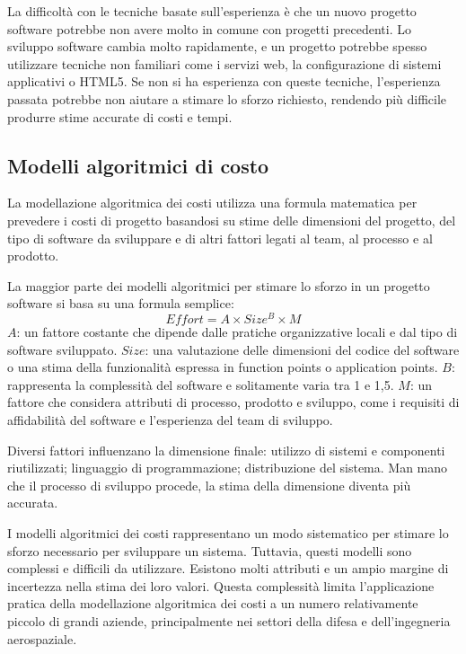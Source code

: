 La difficoltà con le tecniche basate sull'esperienza è che un nuovo progetto software potrebbe non avere molto in comune con progetti precedenti. Lo sviluppo software cambia molto rapidamente, e un progetto potrebbe spesso utilizzare tecniche non familiari come i servizi web, la configurazione di sistemi applicativi o HTML5. Se non si ha esperienza con queste tecniche, l'esperienza passata potrebbe non aiutare a stimare lo sforzo richiesto, rendendo più difficile produrre stime accurate di costi e tempi.

\subsection{Modelli algoritmici di costo}
La modellazione algoritmica dei costi utilizza una formula matematica per prevedere i costi di progetto basandosi su stime delle dimensioni del progetto, del tipo di software da sviluppare e di altri fattori legati al team, al processo e al prodotto.

La maggior parte dei modelli algoritmici per stimare lo sforzo in un progetto software si basa su una formula semplice:
\begin{equation*}
    Effort = A\times Size^B\times M
\end{equation*}
$A$: un fattore costante che dipende dalle pratiche organizzative locali e dal tipo di software sviluppato. $Size$: una valutazione delle dimensioni del codice del software o una stima della funzionalità espressa in function points o application points. $B$: rappresenta la complessità del software e solitamente varia tra 1 e 1,5. $M$: un fattore che considera attributi di processo, prodotto e sviluppo, come i requisiti di affidabilità del software e l'esperienza del team di sviluppo.

Diversi fattori influenzano la dimensione finale: utilizzo di sistemi e componenti riutilizzati; linguaggio di programmazione; distribuzione del sistema. Man mano che il processo di sviluppo procede, la stima della dimensione diventa più accurata.

I modelli algoritmici dei costi rappresentano un modo sistematico per stimare lo sforzo necessario per sviluppare un sistema. Tuttavia, questi modelli sono complessi e difficili da utilizzare. Esistono molti attributi e un ampio margine di incertezza nella stima dei loro valori. Questa complessità limita l'applicazione pratica della modellazione algoritmica dei costi a un numero relativamente piccolo di grandi aziende, principalmente nei settori della difesa e dell'ingegneria aerospaziale.

